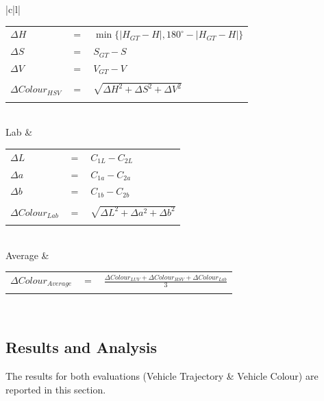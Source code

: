 \begin{table}[tb!]
\begin{tabular}{|c|l|}
\begin{tabular}{lcl}
$\Delta{H}$ & $=$ & $\min\{ \mid H_{GT} - H \mid,  180^{\circ} - \mid H_{GT} - H \mid  \}$ \\
$\Delta{S}$ & $=$ & $S_{GT} - S$ \\
$\Delta{V}$ &  $=$ & $V_{GT} - V$ \\
\\
$\Delta Colour_{HSV}$ & $=$ & $\sqrt{\Delta{H}^{2} + \Delta{S}^{2}  + \Delta{V}^{2} }$
\\
\hspace{4em}& & \\
\end{tabular}\\
\hline
Lab &
\begin{tabular}{lcl}
\\
$\Delta L$ & $=$ & $C_{1L} - C_{2L}$\\
$\Delta a$ & $=$ & $C_{1a} - C_{2a}$\\
$\Delta b$ & $=$ & $C_{1b} - C_{2b}$\\
\\
$\Delta{Colour_{Lab}}$ & $=$ & $\sqrt{\Delta{L}^{2} + \Delta{a}^{2}  + \Delta{b}^{2} }$
\\
\hspace{5em}& & \\
\end{tabular}\\
\hline
Average &
\begin{tabular}{lcl}
\\
$\Delta{Colour_{Average}}$ & $=$ & $\frac{\Delta{Colour_{LUV}} + \Delta{Colour_{HSV}} + \Delta{Colour_{Lab}}}{3}$
\\
\hspace{4em}& & \\
\end{tabular}\\
\hline
\end{tabular}
\label{table:ColorVariation}
\end{table}

\vspace{1em}
\subsection{Results and Analysis}

The results for both evaluations (Vehicle Trajectory \& Vehicle Colour) are reported in this section. 

\vspace{1em}
